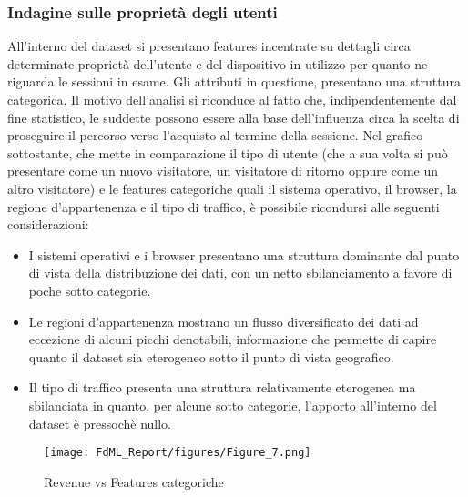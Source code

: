 \documentclass[10pt,a4paper]{article}
\begin{document}
\clearpage

\subsubsection{Indagine sulle proprietà degli utenti}
All'interno del dataset si presentano features incentrate su dettagli circa determinate proprietà dell'utente e del dispositivo in utilizzo per quanto ne riguarda le sessioni in esame. Gli attributi in questione, presentano una struttura categorica. \hfill \break 
Il motivo dell'analisi si riconduce al fatto che, indipendentemente dal fine statistico, le suddette possono essere alla base dell'influenza circa la scelta di proseguire il percorso verso l'acquisto al termine della sessione.
\hfill \break
Nel grafico sottostante, che mette in comparazione il tipo di utente (che a sua volta si può presentare come un nuovo visitatore, un visitatore di ritorno oppure come un altro visitatore) e le features categoriche quali il sistema operativo, il browser, la regione d'appartenenza e il tipo di traffico, è possibile ricondursi alle seguenti considerazioni:
\begin{itemize}
    \item I sistemi operativi e  i browser presentano una struttura dominante dal punto di vista della distribuzione dei dati, con un netto sbilanciamento a favore di poche sotto categorie.
\end{itemize}
\begin{itemize}
    \item Le regioni d'appartenenza mostrano un flusso diversificato dei dati ad eccezione di alcuni picchi denotabili, informazione che permette di capire quanto il dataset sia eterogeneo sotto il punto di vista geografico.
\end{itemize}
\begin{itemize}
    \item Il tipo di traffico presenta una struttura relativamente eterogenea ma sbilanciata in quanto, per alcune sotto categorie, l'apporto all'interno del dataset è pressochè nullo.
\end{itemize}

\begin{figure}[ht]
    \centering
    \texttt{[image: FdML\_Report/figures/Figure\_7.png]}
    \caption{Revenue vs Features categoriche}
    \label{fig:my_label}
\end{figure}
\clearpage
\end{document}
